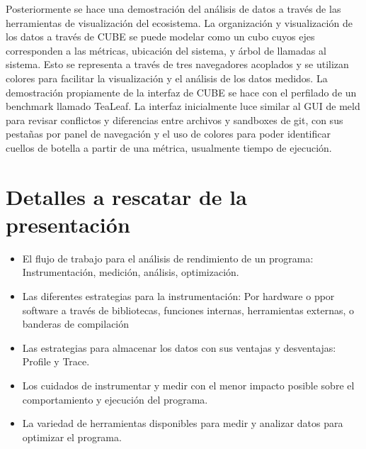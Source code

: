 \documentclass[conference]{IEEEtran}
\begin{document}
Posteriormente se hace una demostración del análisis de datos a través de las herramientas de visualización del ecosistema. La organización y visualización de los datos a través de CUBE se puede modelar como un cubo cuyos ejes corresponden a las métricas, ubicación del sistema, y árbol de llamadas al sistema. Esto se representa a través de tres navegadores acoplados y se utilizan colores para facilitar la visualización y el análisis de los datos medidos. La demostración propiamente de la interfaz de CUBE se hace con el perfilado de un benchmark llamado TeaLeaf. La interfaz inicialmente luce similar al GUI de meld para revisar conflictos y diferencias entre archivos y sandboxes de git, con sus pestañas por panel de navegación y el uso de colores para poder identificar cuellos de botella a partir de una métrica, usualmente tiempo de ejecución.

\section{Detalles a rescatar de la presentación}
\begin{itemize}
    \item El flujo de trabajo para el análisis de rendimiento de un programa: Instrumentación, medición, análisis, optimización.
    \item Las diferentes estrategias para la instrumentación: Por hardware o ppor software a través de bibliotecas, funciones internas, herramientas externas, o banderas de compilación
    \item Las estrategias para almacenar los datos con sus ventajas y desventajas: Profile y Trace.
    \item Los cuidados de instrumentar y medir con el menor impacto posible sobre el comportamiento y ejecución del programa.
    \item La variedad de herramientas disponibles para medir y analizar datos para optimizar el programa.
\end{itemize}




\end{document}
